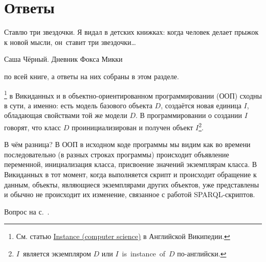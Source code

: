 \chapter*{Ответы}
\label{ch:answers}

\renewcommand{\epigraphflush}{flushright}
\setlength{\epigraphwidth}{.5\linewidth}
\epigraph{%
Ставлю три звездочки. 
Я видал в детских книжках: 
когда человек делает прыжок к новой мысли, 
он~ставит три звездочки\ldots%
}{%
Саша Чёрный. Дневник Фокса Микки}

 по всей книге, а ответы на них собраны в этом разделе.

\begin{task}
    \label{answer:instance-in-OOP-vs-Wikidata}
    \footnote[][0cm]{См. статью 
        \href{https://en.wikipedia.org/wiki/Instance\_(computer\_science)}{Instance (computer science)} в Английской Википедии.
                                                  }%
    в Викиданных 
    и в объектно-ориентированном программировании (ООП) сходны в сути, а именно:
    есть модель базового объекта $D$, создаётся новая единица $I$, обладающая 
    свойствами той же модели $D$. 
    В программировании о создании $I$ говорят, 
    что класс $D$ проинициализирован 
    и получен объект $I$\footnote[][0cm]{%
        $I$~является экземпляром $D$ или 
        \mbox{$I$~is instance of $D$} по-английски.}. 

    В чём разница? 
    В ООП в исходном коде программы мы видим как во времени последовательно 
    (в разных строках программы) происходит 
    объявление переменной, инициализация класса, 
    присвоение значений экземплярам класса.
    В Викиданных в тот момент, когда выполняется скрипт и происходит обращение 
    к данным, объекты, являющиеся экземплярами других объектов, 
    уже представлены и обычно не происходит их изменение, 
    связанное с работой SPARQL-скриптов.

    \small{Вопрос на с.~\pageref{question:instance-in-OOP-vs-Wikidata}.}
\end{task}



